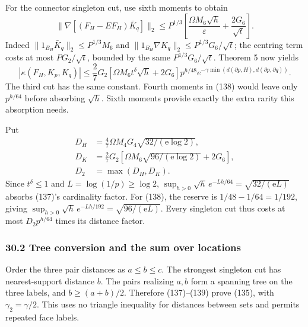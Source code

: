 \documentclass[11pt,a4paper]{article}
\begin{document}
For the connector singleton cut, use sixth moments to obtain
\[\|\nabla[(F_H-EF_H)\bar K_q]\|_2
\le P^{1/3}\left[\frac{\Omega M_6\sqrt h}{\varepsilon}
                              +\frac{2G_6}{\sqrt t}\right].\] Indeed
\(\|1_{B_H}\bar K_q\|_2\le P^{1/3}M_6\) and
\(\|1_{B_H}\nabla K_q\|_2\le P^{1/3}G_6/\sqrt t\); the centring term
costs at most \(P G_2/\sqrt t\), bounded by the same
\(P^{1/3}G_6/\sqrt t\). Theorem 5 now yields \[|\kappa(F_H,K_p,K_q)|
\le\frac27G_2[\Omega M_6t^\delta\sqrt h+2G_6]p^{h/48}
 e^{-\gamma\min(d(\partial p,H),d(\partial p,\partial q))}.
\tag{138}\] The third cut has the same constant. Fourth moments in (138)
would leave only \(p^{h/64}\) before absorbing \(\sqrt h\). Sixth
moments provide exactly the extra rarity this absorption needs.

Put \[\begin{aligned}
D_H&=\frac47\Omega M_4G_4\sqrt{32/(\mathrm e\log2)},\\
D_K&=\frac27G_2\left[
 \Omega M_6\sqrt{96/(\mathrm e\log2)}+2G_6\right],\\
D_2&=\max(D_H,D_K).
\end{aligned}\tag{139}\] Since \(t^\delta\le1\) and
\(L=\log(1/p)\ge\log2\),
\(\sup_{h>0}\sqrt h\,e^{-Lh/64}=\sqrt{32/(\mathrm eL)}\) absorbs (137)'s
cardinality factor. For (138), the reserve is \(1/48-1/64=1/192\),
giving \(\sup_{h>0}\sqrt h\,e^{-Lh/192}=\sqrt{96/(\mathrm eL)}\). Every
singleton cut thus costs at most \(D_2p^{h/64}\) times its distance
factor.

\hypertarget{tree-conversion-and-the-sum-over-locations}{%
\subsubsection{30.2 Tree conversion and the sum over
locations}\label{tree-conversion-and-the-sum-over-locations}}

Order the three pair distances as \(a\le b\le c\). The strongest
singleton cut has nearest-support distance \(b\). The pairs realizing
\(a,b\) form a spanning tree on the three labels, and \(b\ge(a+b)/2\).
Therefore (137)--(139) prove (135), with \(\gamma_2=\gamma/2\). This
uses no triangle inequality for distances between sets and permits
repeated face labels.
\end{document}

